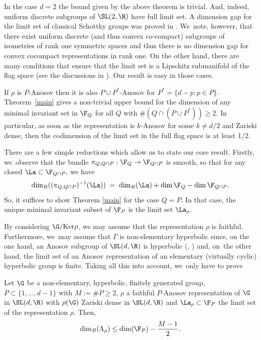 In the case \(d = 2\) the bound given by the above theorem is trivial. And, indeed, uniform discrete subgroups of \(\SL(2,\R)\) have full limit set. A dimension gap for the limit set of classical Schottky groups was proved in \cite{Doy88}. We~note, however, that there exist uniform discrete (and thus convex co-compact) subgroups of isometries of
rank one symmetric spaces and thus there is no dimension gap for convex cocompact representations in rank one. On the other hand, there are many conditions that ensure that the limit set is a Lipschitz submanifold of the flag space (see the discussions in \cite{PSW19}). Our result is easy in those cases.

If \(\rho\) is \(P\)-Anosov then it is also \(P \cup P^\ast\)-Anosov for \(P^\ast = \lbrace d-p: p \in P\rbrace\). Theorem~\ref{main} gives a non-trivial upper bound for the dimension of any minimal invariant set in \(\F_{Q}\) for all \(Q\) with \(\#(Q\cap (P \cup P^\ast)) \ge 2\). In particular, as soon as the representation is \(k\)-Anosov for some \(k \not = d/2\) and Zariski dense, then the codimension of the limit set in the full flag space is at least 1/2.

There are a few simple reductions which allow us to state our core result. Firstly, we~observe that the bundle \(\pi_{Q, Q\cap P} : \F_Q \to \F_{Q\cap P} \) is smooth, so that for any closed \(\La \subset \F_{Q\cap P}, \) we have
\[
 \dim_B ((\pi_{Q, Q\cap P})^{-1} (\La)) \; = \; \dim_B (\La) + \dim \F_Q - \dim \F_{Q\cap P}.
\]
So, it suffices to show Theorem \ref{main} for the case \(Q= P\). In that case, the unique minimal invariant subset of \(\F_{P}\) is the limit set \(\La_\rho\).

By considering \(\G /{\textrm {Ker}} \rho\), we may assume that the representation \(\rho\) is faithful. Furthermore, we~may assume that \(\Gamma\) is non-elementary hyperbolic since, on the one hand, an Anosov subgroup of \(\SL (d,\R) \) is hyperbolic (\cite{KLP18}, \cite[Th.\,3.2]{BPS19}) and, on~the other hand, the limit set of an Anosov representation of an elementary (\ie virtually cyclic) hyperbolic group is finite. Taking all this into account, we~only have to prove
\begin{theorem}\label{maintheorem}
Let \(\G\) be a non-elementary, hyperbolic, finitely generated group, \(P \subset \lbrace 1,\ldots, d -1\rbrace\) with \(M:= \#P \ge 2 \), \(\rho \) a faithful \(P\)-Anosov representation of \(\G\) in \(\SL (d,\R) \) with \(\rho(\G)\) Zariski dense in \(\SL (d,\R) \) and \(\La_\rho \subset \F_{P} \) the limit set of the representation \(\rho\). Then,
\[
\dim_B(\Lambda_\rho) \le \dim(\F_{P}) - \frac{M - 1}{2}.
\]
\end{theorem}

